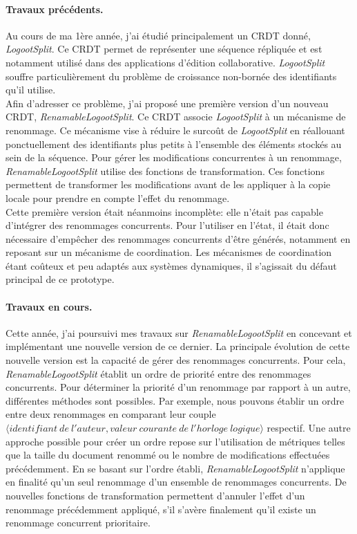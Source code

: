 \documentclass[12pt]{article}
\begin{document}
\paragraph{\small Travaux précédents.}
Au cours de ma 1ère année, j'ai étudié principalement un \ac{CRDT} donné, \emph{LogootSplit}.
Ce \ac{CRDT} permet de représenter une séquence répliquée et est notamment utilisé dans des applications d'édition collaborative.
\emph{LogootSplit} souffre particulièrement du problème de croissance non-bornée des identifiants qu'il utilise.
\\

Afin d'adresser ce problème, j'ai proposé une première version d'un nouveau \ac{CRDT}, \emph{RenamableLogootSplit}.
Ce \ac{CRDT} associe \emph{LogootSplit} à un mécanisme de renommage.
Ce mécanisme vise à réduire le surcoût de \emph{LogootSplit} en réallouant ponctuellement des identifiants plus petits à l'ensemble des éléments stockés au sein de la séquence.
Pour gérer les modifications concurrentes à un renommage, \emph{RenamableLogootSplit} utilise des fonctions de transformation.
Ces fonctions permettent de transformer les modifications avant de les appliquer à la copie locale pour prendre en compte l'effet du renommage.
\\

Cette première version était néanmoins incomplète: elle n'était pas capable d'intégrer des renommages concurrents.
Pour l'utiliser en l'état, il était donc nécessaire d'empêcher des renommages concurrents d'être générés, notamment en reposant sur un mécanisme de coordination.
Les mécanismes de coordination étant coûteux et peu adaptés aux systèmes dynamiques, il s'agissait du défaut principal de ce prototype.

\paragraph{\small Travaux en cours.}
Cette année, j'ai poursuivi mes travaux sur \emph{RenamableLogootSplit} en concevant et implémentant une nouvelle version de ce dernier.
La principale évolution de cette nouvelle version est la capacité de gérer des renommages concurrents.
Pour cela, \emph{RenamableLogootSplit} établit un ordre de priorité entre des renommages concurrents.
Pour déterminer la priorité d'un renommage par rapport à un autre, différentes méthodes sont possibles.
Par exemple, nous pouvons établir un ordre entre deux renommages en comparant leur couple $\langle identifiant\ de\ l'auteur, valeur\ courante\ de\ l'horloge\ logique\rangle$ respectif.
Une autre approche possible pour créer un ordre repose sur l'utilisation de métriques telles que la taille du document renommé ou le nombre de modifications effectuées précédemment.
En se basant sur l'ordre établi, \emph{RenamableLogootSplit} n'applique en finalité qu'un seul renommage d'un ensemble de renommages concurrents.
De nouvelles fonctions de transformation permettent d'annuler l'effet d'un renommage précédemment appliqué, s'il s'avère finalement qu'il existe un renommage concurrent prioritaire.
\\
\end{document}
